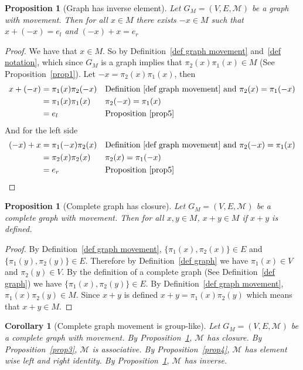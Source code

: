 \documentclass[a4paper,11pt]{article}
\theoremstyle{plain}
\newtheorem{proposition}[theorem]{Proposition}
\newtheorem{corollary}[theorem]{Corollary}
\theoremstyle{definition}
\begin{document}
\begin{proposition}[Graph has inverse element]\label{prop5}
	Let $G_M =(V,E,\mathcal{M})$ be a graph with movement. Then for
	all $x \in M$ there exists $-x \in M$ such that $x+(-x) = e_l$
	and $(-x)+x = e_r$
\end{proposition}
\begin{proof}
	We have that $x \in M$. So by Definition~\ref{def graph movement}
	and~\ref{def notation}, which since $G_M$ is a graph implies that
	$\pi_2(x)\pi_1(x) \in M$ (See Proposition~\ref{prop1}). Let $-x =
	\pi_2(x)\pi_1(x)$, then
	\begin{equation}
	\begin{aligned}
		x+(-x) &= \pi_1(x)\pi_2(-x) && \text{Definition~\ref{def graph
		movement} and $\pi_2(x)= \pi_1(-x)$} \\
		&= \pi_1(x)\pi_1(x) && \text{$\pi_2(-x)= \pi_1(x)$} \\
		&= e_l && \text{Proposition~\ref{prop5}} \\
	\end{aligned}
	\end{equation}
	And for the left side
	\begin{equation}
	\begin{aligned}
		(-x)+x &= \pi_1(-x)\pi_2(x) && \text{Definition~\ref{def graph
		movement} and $\pi_2(-x)= \pi_1(x)$} \\
		&= \pi_2(x)\pi_2(x) && \text{$\pi_2(x)= \pi_1(-x)$} \\
		&= e_r && \text{Proposition~\ref{prop5}} \\
	\end{aligned}
	\end{equation}
\end{proof}
\begin{proposition}[Complete graph has closure]\label{prop6}
	Let $G_M =(V,E,\mathcal{M})$ be a complete graph with
	movement. Then for all $x,y \in M$, $x+y \in M$ if $x+y$
	is defined.
\end{proposition}
\begin{proof}
	By Definition~\ref{def graph movement}, $\{\pi_1(x),\pi_2(x)\}
	\in E$ and $\{\pi_1(y),\pi_2(y)\} \in E$. Therefore by
	Definition~\ref{def graph} we have $\pi_1(x)\in V$ and $\pi_2(y) \in V$. By the definition of a complete graph (See
	Definition~\ref{def graph}) we have $\{\pi_1(x),\pi_2(y)\} \in
	E$. By Definition~\ref{def graph movement}, $\pi_1(x)\pi_2(y)
	\in M$. Since $x+y$ is defined $x+y=\pi_1(x)\pi_2(y)$ which
	means that $x+y\in M$.
\end{proof}
\begin{corollary}[Complete graph movement is group-like]\label{cor1}
	Let $G_M=(V,E,\mathcal{M})$ be a complete graph with movement.
	By Proposition~\ref{prop6}, $\mathcal{M}$ has closure. By
	Proposition~\ref{prop3}, $\mathcal{M}$ is associative. By
	Proposition~\ref{prop4}, $\mathcal{M}$ has element wise left
	and right identity. By Proposition~\ref{prop5}, $\mathcal{M}$
	has inverse.
\end{corollary}
\end{document}
